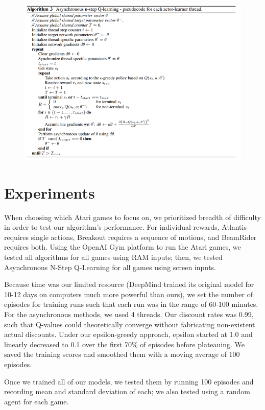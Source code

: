 \documentclass[11pt]{article}
\begin{document}
\begin{figure}[H]
    \includegraphics[scale=1.3]{nstep}
\end{figure} \newpage

\section{Experiments}

When choosing which Atari games to focus on, we prioritized breadth of difficulty in order to test our algorithm's performance. For individual rewards, Atlantis requires single actions, Breakout requires a sequence of motions, and BeamRider requires both. Using the OpenAI Gym platform to run the Atari games, we tested all algorithms for all games using RAM inputs; then, we tested Asynchronous N-Step Q-Learning for all games using screen inputs.
 
Because time was our limited resource (DeepMind trained its original model for 10-12 days on computers much more powerful than ours), we set the number of episodes for training runs such that each run was in the range of 60-100 minutes. For the asynchronous methods, we used 4 threads. Our discount rates was 0.99, such that Q-values could theoretically converge without fabricating non-existent actual discounts. Under our epsilon-greedy approach, epsilon started at 1.0 and linearly decreased to 0.1 over the first 70\% of episodes before plateauing. We saved the training scores and smoothed them with a moving average of 100 episodes.
 
Once we trained all of our models, we tested them by running 100 episodes and recording mean and standard deviation of each; we also tested using a random agent for each game.
\end{document}
